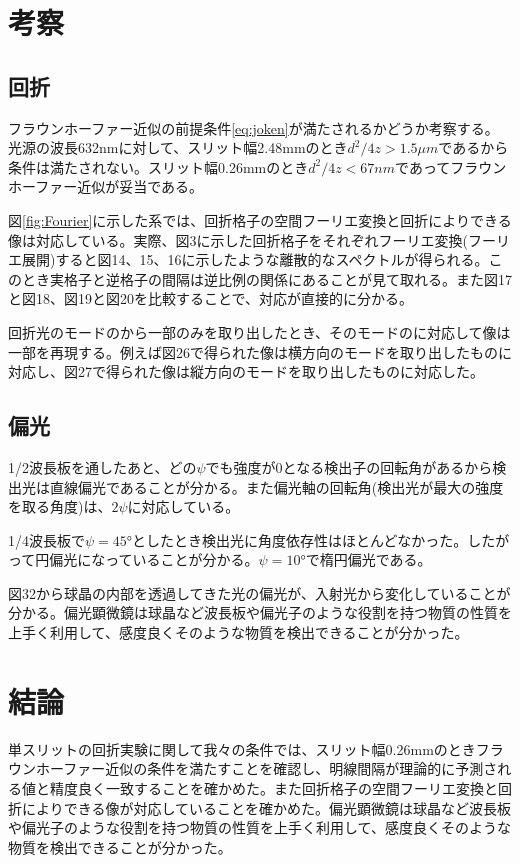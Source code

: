 \documentclass[11pt,a4]{jarticle}
\begin{document}
\section{考察}
\subsection{回折}
フラウンホーファー近似の前提条件\ref{eq:joken}が満たされるかどうか考察する。光源の波長632nmに対して、スリット幅2.48mmのとき$d^2 /4z >1.5 \mu m$であるから条件は満たされない。スリット幅0.26mmのとき$d^2 /4z < 67 nm$であってフラウンホーファー近似が妥当である。

図\ref{fig:Fourier}に示した系では、回折格子の空間フーリエ変換と回折によりできる像は対応している。実際、図3に示した回折格子をそれぞれフーリエ変換(フーリエ展開)すると図14、15、16に示したような離散的なスペクトルが得られる。このとき実格子と逆格子の間隔は逆比例の関係にあることが見て取れる。また図17と図18、図19と図20を比較することで、対応が直接的に分かる。

回折光のモードのから一部のみを取り出したとき、そのモードのに対応して像は一部を再現する。例えば図26で得られた像は横方向のモードを取り出したものに対応し、図27で得られた像は縦方向のモードを取り出したものに対応した。


\subsection{偏光}
1/2波長板を通したあと、どの$\psi$でも強度が0となる検出子の回転角があるから検出光は直線偏光であることが分かる。また偏光軸の回転角(検出光が最大の強度を取る角度)は、$2\psi$に対応している。

1/4波長板で$\psi=45$°としたとき検出光に角度依存性はほとんどなかった。したがって円偏光になっていることが分かる。$\psi=10$°で楕円偏光である。

図32から球晶の内部を透過してきた光の偏光が、入射光から変化していることが分かる。偏光顕微鏡は球晶など波長板や偏光子のような役割を持つ物質の性質を上手く利用して、感度良くそのような物質を検出できることが分かった。

\section{結論}
単スリットの回折実験に関して我々の条件では、スリット幅0.26mmのときフラウンホーファー近似の条件を満たすことを確認し、明線間隔が理論的に予測される値と精度良く一致することを確かめた。また回折格子の空間フーリエ変換と回折によりできる像が対応していることを確かめた。偏光顕微鏡は球晶など波長板や偏光子のような役割を持つ物質の性質を上手く利用して、感度良くそのような物質を検出できることが分かった。
\end{document}
